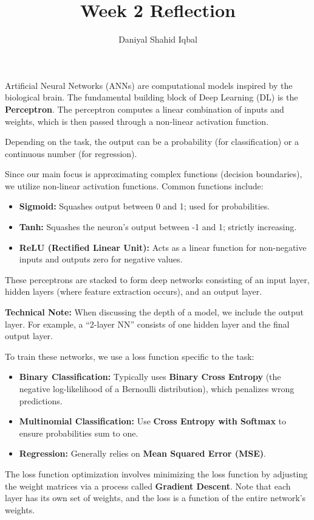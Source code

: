 \documentclass{article}
\title{Week 2 Reflection}
\author{Daniyal Shahid Iqbal}
\begin{document}
\maketitle


Artificial Neural Networks (ANNs) are computational models inspired by the biological brain. The fundamental building block of Deep Learning (DL) is the \textbf{Perceptron}. The perceptron computes a linear combination of inputs and weights, which is then passed through a non-linear activation function.

Depending on the task, the output can be a probability (for classification) or a continuous number (for regression).

Since our main focus is approximating complex functions (decision boundaries), we utilize non-linear activation functions. Common functions include:
\begin{itemize}
    \item \textbf{Sigmoid:} Squashes output between 0 and 1; used for probabilities.
    \item \textbf{Tanh:} Squashes the neuron’s output between -1 and 1; strictly increasing.
    \item \textbf{ReLU (Rectified Linear Unit):} Acts as a linear function for non-negative inputs and outputs zero for negative values.
\end{itemize}


These perceptrons are stacked to form deep networks consisting of an input layer, hidden layers (where feature extraction occurs), and an output layer.

\textbf{Technical Note:} When discussing the depth of a model, we include the output layer. For example, a ``2-layer NN'' consists of one hidden layer and the final output layer.


To train these networks, we use a loss function specific to the task:
\begin{itemize}
    \item \textbf{Binary Classification:} Typically uses \textbf{Binary Cross Entropy} (the negative log-likelihood of a Bernoulli distribution), which penalizes wrong predictions.
    \item \textbf{Multinomial Classification:} Use \textbf{Cross Entropy with Softmax} to ensure probabilities sum to one.
    \item \textbf{Regression:} Generally relies on \textbf{Mean Squared Error (MSE)}.
\end{itemize}

The loss function optimization involves minimizing the loss function by adjusting the weight matrices via a process called \textbf{Gradient Descent}. Note that each layer has its own set of weights, and the loss is a function of the entire network's weights.
\end{document}
